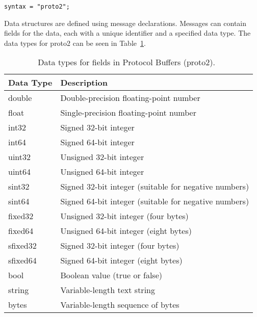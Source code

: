 \documentclass[../MasterThesis.tex]{subfiles}
\begin{document}
\begin{lstlisting}[style=protobufStyle, numbers=none]
	syntax = "proto2";
\end{lstlisting}

\begin{description}[font=\normalfont\color{RedViolet!80!black}, style=nextline]
	

\item[Messages and Fields] 

Data structures are defined using message declarations. Messages can contain fields for the data, each with a unique identifier and a specified data type. The data types for proto2 can be seen in Table~\ref{table:proto2_data_types}.~\cite{proto2_doc}


\begin{table}[H]
	\centering

	\begin{tabular}{ll}
		\toprule
		\textbf{Data Type} & \textbf{Description} \\
		\midrule
		double & Double-precision floating-point number \\
		float & Single-precision floating-point number \\
		int32 & Signed 32-bit integer \\
		int64 & Signed 64-bit integer \\
		uint32 & Unsigned 32-bit integer \\
		uint64 & Unsigned 64-bit integer \\
		sint32 & Signed 32-bit integer (suitable for negative numbers) \\
		sint64 & Signed 64-bit integer (suitable for negative numbers) \\
		fixed32 & Unsigned 32-bit integer (four bytes) \\
		fixed64 & Unsigned 64-bit integer (eight bytes) \\
		sfixed32 & Signed 32-bit integer (four bytes) \\
		sfixed64 & Signed 64-bit integer (eight bytes) \\
		bool & Boolean value (true or false) \\
		string & Variable-length text string  \\
		bytes & Variable-length sequence of bytes \\
		\bottomrule
	\end{tabular}
	\caption{Data types for fields in Protocol Buffers (proto2).~\cite{proto2_doc}}
	\label{table:proto2_data_types}
\end{table}


\end{description}
\end{document}
